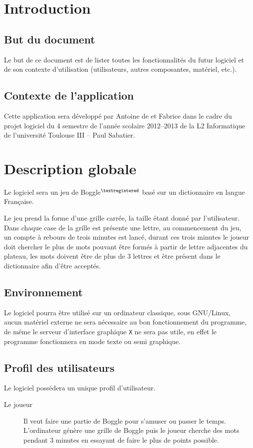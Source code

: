 \documentclass[12pt,a4paper,openany]{article}
\begin{document}
	\setcounter{tocdepth}{2}
	\setcounter{secnumdepth}{3}
	\maketitle
	\tableofcontents
	\newpage
	\section{Introduction}
		\subsection{But du document}
	Le but de ce document est de lister toutes les fonctionnalités du futur logiciel et de son contexte d’utilisation (utilisateurs, autres composantes,
	matériel,  etc.).
		\subsection{Contexte de l'application}
		Cette application sera développé par Antoine de  et Fabrice  dans le cadre du projet logiciel du 
		4\ieme{} semestre de l'année scolaire 2012--2013 de la L2 Informatique de l'université Toulouse III -- Paul Sabatier.
	
	\section{Description globale} 
	Le logiciel sera un jeu de Boggle$^{\tiny\textregistered}$ basé sur un dictionnaire en langue Française.

	Le jeu prend la forme d'une grille carrée, la taille étant donné par l'utilisateur. Dans chaque case de la grille est présente une lettre, au
	commencement du jeu, un compte à rebours de trois minutes est lancé, durant ces trois minutes le joueur doit chercher le plus de mots pouvant être
	formés à partir de lettre adjacentes du plateau, les mots doivent être de plus de 3 lettres et être présent dans le dictionnaire afin d'être
	acceptés.
	\subsection{Environnement}
		Le logiciel pourra être utilisé sur un ordinateur classique, sous GNU/Linux, aucun matériel externe ne sera nécessaire au bon fonctionnement du
		programme, de même le serveur d'interface graphique \texttt{X} ne sera pas utile, en effet le programme fonctionnera en mode texte ou semi graphique.
	\subsection{Profil des utilisateurs}
		Le logiciel possédera un unique profil d'utilisateur.
		\begin{description}
			\item[Le joueur] Il veut faire une partie de Boggle pour s'amuser ou passer le temps. L'ordinateur génère une grille de Boggle puis le
				joueur cherche des mots pendant 3 minutes en essayant de faire le plus de points possible. 
		\end{description}
\end{document}
